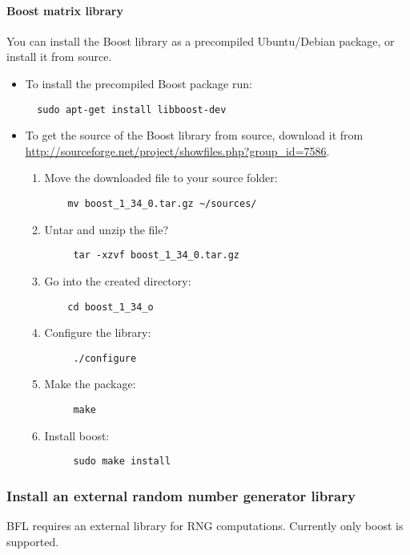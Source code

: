 \documentclass[a4paper,10pt]{article}
\begin{document}
\paragraph{Boost matrix library}
You can install the Boost library as a precompiled Ubuntu/Debian
package, or install it from source.
\begin{itemize}
\item To install the precompiled Boost package run:
\begin{verbatim}
  sudo apt-get install libboost-dev
\end{verbatim}
\item To get the source of the Boost library from source, download it from \url{http://sourceforge.net/project/showfiles.php?group_id=7586}.
\begin{enumerate}
 \item Move the downloaded file to your source folder:
	\begin{verbatim}
	mv boost_1_34_0.tar.gz ~/sources/
	\end{verbatim}
 \item Untar and unzip the file?
 	\begin{verbatim}
 	 tar -xzvf boost_1_34_0.tar.gz
 	\end{verbatim}
 \item Go into the created directory:
 	\begin{verbatim}
 	cd boost_1_34_o
 	\end{verbatim}
 \item Configure the library:
	\begin{verbatim}
	 ./configure
	\end{verbatim}
 \item Make the package:
	\begin{verbatim}
	 make
	\end{verbatim}
\item Install boost:
	\begin{verbatim}
	 sudo make install
	\end{verbatim}
\end{enumerate}

\end{itemize}









\subsubsection{Install an external random number generator library}
BFL requires an external library for RNG computations. Currently only
boost is supported.
\end{document}
